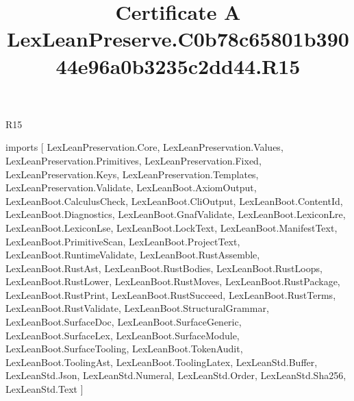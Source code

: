 \begin{lexlean}{R15}
\title{Certificate A LexLeanPreserve.C0b78c65801b39044e96a0b3235c2dd44.R15}
\begin{coremodule}
imports [
  LexLeanPreservation.Core,
  LexLeanPreservation.Values,
  LexLeanPreservation.Primitives,
  LexLeanPreservation.Fixed,
  LexLeanPreservation.Keys,
  LexLeanPreservation.Templates,
  LexLeanPreservation.Validate,
  LexLeanBoot.AxiomOutput,
  LexLeanBoot.CalculusCheck,
  LexLeanBoot.CliOutput,
  LexLeanBoot.ContentId,
  LexLeanBoot.Diagnostics,
  LexLeanBoot.GnafValidate,
  LexLeanBoot.LexiconLre,
  LexLeanBoot.LexiconLse,
  LexLeanBoot.LockText,
  LexLeanBoot.ManifestText,
  LexLeanBoot.PrimitiveScan,
  LexLeanBoot.ProjectText,
  LexLeanBoot.RuntimeValidate,
  LexLeanBoot.RustAssemble,
  LexLeanBoot.RustAst,
  LexLeanBoot.RustBodies,
  LexLeanBoot.RustLoops,
  LexLeanBoot.RustLower,
  LexLeanBoot.RustMoves,
  LexLeanBoot.RustPackage,
  LexLeanBoot.RustPrint,
  LexLeanBoot.RustSucceed,
  LexLeanBoot.RustTerms,
  LexLeanBoot.RustValidate,
  LexLeanBoot.StructuralGrammar,
  LexLeanBoot.SurfaceDoc,
  LexLeanBoot.SurfaceGeneric,
  LexLeanBoot.SurfaceLex,
  LexLeanBoot.SurfaceModule,
  LexLeanBoot.SurfaceTooling,
  LexLeanBoot.TokenAudit,
  LexLeanBoot.ToolingAst,
  LexLeanBoot.ToolingLatex,
  LexLeanStd.Buffer,
  LexLeanStd.Json,
  LexLeanStd.Numeral,
  LexLeanStd.Order,
  LexLeanStd.Sha256,
  LexLeanStd.Text
]


\end{coremodule}
\end{lexlean}
